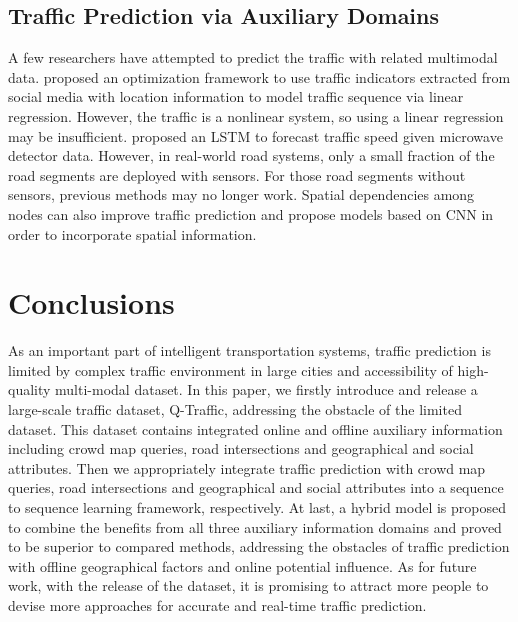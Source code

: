 \subsection{Traffic Prediction via Auxiliary Domains}
A few researchers have attempted to predict the traffic with related multimodal data. \cite{he2013improving} \cite{liu2016collective} proposed an optimization framework to use traffic indicators extracted from social media with location information to model traffic sequence via linear regression. However, the traffic is a nonlinear system, so using a linear regression may be insufficient. \cite{ma2015long} proposed an LSTM to forecast traffic speed given microwave detector data. However, in real-world road systems, only a small fraction of the road segments are deployed with sensors. For those road segments without sensors, previous methods may no longer work. Spatial dependencies among nodes can also improve traffic prediction \cite{asif2014spatiotemporal} and  \cite{yu2017spatio,ma2017learning} propose models based on CNN in order to incorporate spatial information.

\section{Conclusions}
\label{conclusions}
As an important part of intelligent transportation systems, traffic prediction is limited by complex traffic environment in large cities and accessibility of high-quality multi-modal dataset. In this paper, we firstly introduce and release a large-scale traffic dataset, Q-Traffic, addressing the obstacle of the limited dataset. This dataset contains integrated online and offline auxiliary information including crowd map queries, road intersections and geographical and social attributes. Then we appropriately integrate traffic prediction with crowd map queries, road intersections and geographical and social attributes into a sequence to sequence learning framework, respectively. At last, a hybrid model is proposed to combine the benefits from all three auxiliary information domains and proved to be superior to compared methods, addressing the obstacles of traffic prediction with offline geographical factors and online potential influence. As for future work, with the release of the dataset, it is promising to attract more people to devise more approaches for accurate and real-time traffic prediction.
